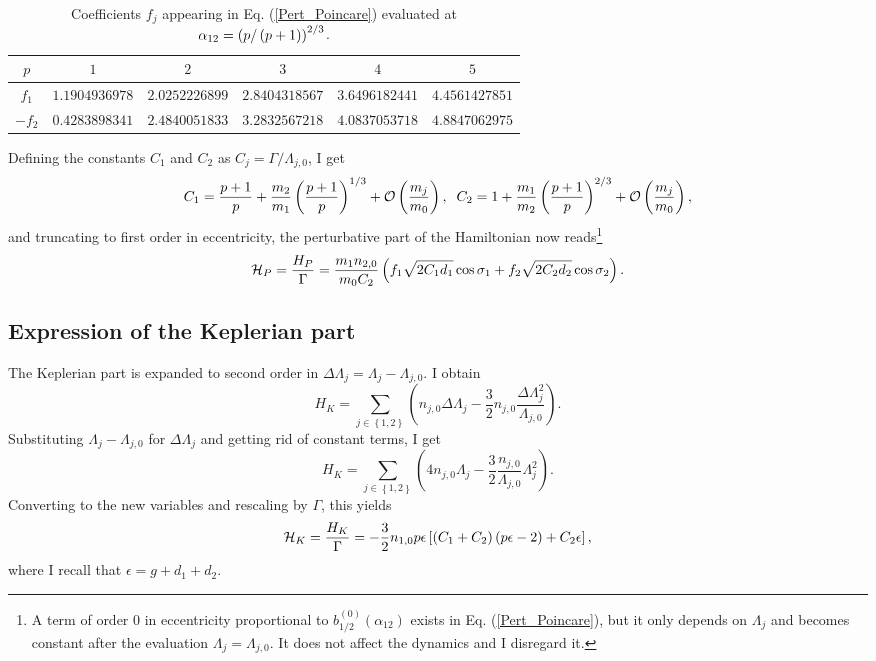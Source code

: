\documentclass[12pt,a4paper,oneside]{article}
\begin{document}
\begin{table}
	\begin{center}
		\begin{tabular}{cccccc}
			\hline
			\hline
			$p$&$1$&$2$&$3$&$4$&$5$\\
			\hline
			$f_1$&$1.1904936978$&$2.0252226899$&$2.8404318567$&$3.6496182441$&$4.4561427851$\\
			$-f_2$&$0.4283898341$&$2.4840051833$&$3.2832567218$&$4.0837053718$&$4.8847062975$\\
			\hline
			\hline
		\end{tabular}
		\caption{Coefficients $f_j$ appearing in Eq. (\ref{Pert_Poincare}) evaluated at $\alpha_{12}=\left(p/\left(p+1\right)\right)^{2/3}$.}\label{tab:f_j}
	\end{center}
\end{table}
Defining the constants $C_1$ and $C_2$ as $C_j=\Gamma/\Lambda_{j,0}$, I get
\begin{equation}
	C_1=\frac{p+1}{p}+\frac{m_2}{m_1}\left(\frac{p+1}{p}\right)^{1/3}+\mathcal{O}\left(\frac{m_j}{m_0}\right),\;\;C_2=1+\frac{m_1}{m_2}\left(\frac{p+1}{p}\right)^{2/3}+\mathcal{O}\left(\frac{m_j}{m_0}\right),
\end{equation}
and truncating to first order in eccentricity, the perturbative part of the Hamiltonian now reads\footnote{A term of order $0$ in eccentricity proportional to $b_{1/2}^{(0)}(\alpha_{12})$ exists in Eq. (\ref{Pert_Poincare}), but it only depends on $\Lambda_j$ and becomes constant after the evaluation $\Lambda_j=\Lambda_{j,0}$. It does not affect the dynamics and I disregard it.}
\begin{equation}\label{eq:Hp_sigma_d}
	\mathcal{H}_P=\frac{H_P}{\Gamma}=\frac{m_1n_{2,0}}{m_0C_2}\left(f_1\sqrt{2C_1d_1}\cos\sigma_1+f_2\sqrt{2C_2d_2}\cos\sigma_2\right).
\end{equation}

\subsection{Expression of the Keplerian part}

The Keplerian part is expanded to second order in $\Delta\Lambda_j=\Lambda_j-\Lambda_{j,0}$. I obtain
\begin{equation}
	H_K=\sum_{j\in\left\lbrace1,2\right\rbrace}\left(n_{j,0}\Delta\Lambda_j-\frac{3}{2}n_{j,0}\frac{\Delta\Lambda_j^2}{\Lambda_{j,0}}\right).
\end{equation}
Substituting $\Lambda_j-\Lambda_{j,0}$ for $\Delta\Lambda_j$ and getting rid of constant terms, I get
\begin{equation}
	H_K=\sum_{j\in\left\lbrace1,2\right\rbrace}\left(4n_{j,0}\Lambda_j-\frac{3}{2}\frac{n_{j,0}}{\Lambda_{j,0}}\Lambda_j^2\right).
\end{equation}
Converting to the new variables and rescaling by $\Gamma$, this yields
\begin{equation}\label{final_Keplerian}
	\mathcal{H}_K=\frac{H_K}{\Gamma}=-\frac{3}{2}n_{1,0}p\epsilon\left[\left(C_1+C_2\right)\left(p\epsilon-2\right)+C_2\epsilon\right],
\end{equation}
where I recall that $\epsilon=g+d_1+d_2$. 
\end{document}
